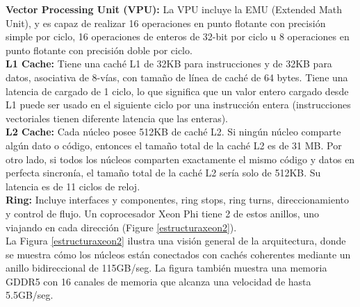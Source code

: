 \textbf{Vector Processing Unit (VPU):} La VPU incluye la EMU (Extended Math Unit), y es capaz de realizar 16
operaciones en punto flotante con precisión simple por ciclo, 16 operaciones de enteros de 32-bit por ciclo u
8 operaciones en punto flotante con precisión doble por ciclo.\\

\textbf{L1 Cache:} Tiene una caché L1 de 32KB para instrucciones y de 32KB para datos, asociativa de 8-vías, con tamaño de línea de caché de 64 bytes. Tiene una latencia de cargado de 1 ciclo, lo que significa que un valor
entero cargado desde L1 puede ser usado en el siguiente ciclo por una instrucción entera (instrucciones vectoriales tienen diferente latencia que las enteras).\\

\textbf{L2 Cache:} Cada núcleo posee 512KB de caché L2. Si ningún núcleo comparte algún dato o código, entonces el tamaño total de la caché L2 es de 31 MB. Por otro lado, si todos los núcleos comparten exactamente el mismo
código y datos en perfecta sincronía, el tamaño total de la caché L2 sería solo de 512KB. Su latencia es de 11
ciclos de reloj.\\

\textbf{Ring:} Incluye interfaces y componentes, ring stops, ring turns, direccionamiento y control de flujo. Un coprocesador Xeon Phi tiene 2 de estos anillos, uno viajando en cada dirección (Figure \ref{estructuraxeon2}).\\

La Figura \ref{estructuraxeon2} ilustra una visión general de la arquitectura, donde se muestra cómo los núcleos están conectados con cachés coherentes mediante un anillo bidireccional de 115GB/seg. La figura también muestra una memoria GDDR5 con 16 canales de memoria que alcanza una velocidad de hasta 5.5GB/seg.


